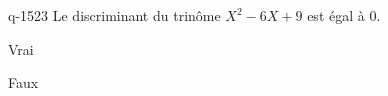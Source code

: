 \begin{truefalse}{q-1523}
Le discriminant du trinôme $X^2-6X+9$ est égal à $0$.
\item* Vrai
\item Faux
\end{truefalse}

